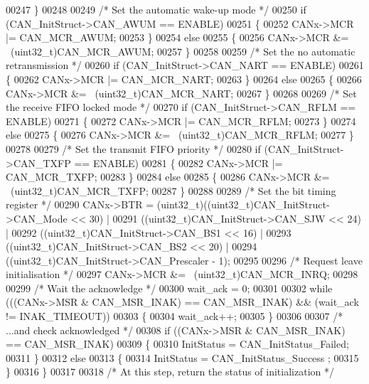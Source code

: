 \begin{DoxyCode}
00247     \}
00248 
00249     \textcolor{comment}{/* Set the automatic wake-up mode */}
00250     \textcolor{keywordflow}{if} (CAN\_InitStruct->CAN\_AWUM == ENABLE)
00251     \{
00252       CANx->MCR |= CAN_MCR_AWUM;
00253     \}
00254     \textcolor{keywordflow}{else}
00255     \{
00256       CANx->MCR &= ~(uint32\_t)CAN_MCR_AWUM;
00257     \}
00258 
00259     \textcolor{comment}{/* Set the no automatic retransmission */}
00260     \textcolor{keywordflow}{if} (CAN\_InitStruct->CAN\_NART == ENABLE)
00261     \{
00262       CANx->MCR |= CAN_MCR_NART;
00263     \}
00264     \textcolor{keywordflow}{else}
00265     \{
00266       CANx->MCR &= ~(uint32\_t)CAN_MCR_NART;
00267     \}
00268 
00269     \textcolor{comment}{/* Set the receive FIFO locked mode */}
00270     \textcolor{keywordflow}{if} (CAN\_InitStruct->CAN\_RFLM == ENABLE)
00271     \{
00272       CANx->MCR |= CAN_MCR_RFLM;
00273     \}
00274     \textcolor{keywordflow}{else}
00275     \{
00276       CANx->MCR &= ~(uint32\_t)CAN_MCR_RFLM;
00277     \}
00278 
00279     \textcolor{comment}{/* Set the transmit FIFO priority */}
00280     \textcolor{keywordflow}{if} (CAN\_InitStruct->CAN\_TXFP == ENABLE)
00281     \{
00282       CANx->MCR |= CAN_MCR_TXFP;
00283     \}
00284     \textcolor{keywordflow}{else}
00285     \{
00286       CANx->MCR &= ~(uint32\_t)CAN_MCR_TXFP;
00287     \}
00288 
00289     \textcolor{comment}{/* Set the bit timing register */}
00290     CANx->BTR = (uint32\_t)((uint32\_t)CAN\_InitStruct->CAN\_Mode << 30) |
00291                 ((uint32\_t)CAN\_InitStruct->CAN\_SJW << 24) |
00292                 ((uint32\_t)CAN\_InitStruct->CAN\_BS1 << 16) |
00293                 ((uint32\_t)CAN\_InitStruct->CAN\_BS2 << 20) |
00294                ((uint32\_t)CAN\_InitStruct->CAN\_Prescaler - 1);
00295 
00296     \textcolor{comment}{/* Request leave initialisation */}
00297     CANx->MCR &= ~(uint32\_t)CAN_MCR_INRQ;
00298 
00299    \textcolor{comment}{/* Wait the acknowledge */}
00300    wait\_ack = 0;
00301 
00302    \textcolor{keywordflow}{while} (((CANx->MSR & CAN_MSR_INAK) == CAN_MSR_INAK) && (wait\_ack != 
      INAK_TIMEOUT))
00303    \{
00304      wait\_ack++;
00305    \}
00306 
00307     \textcolor{comment}{/* ...and check acknowledged */}
00308     \textcolor{keywordflow}{if} ((CANx->MSR & CAN_MSR_INAK) == CAN_MSR_INAK)
00309     \{
00310       InitStatus = CAN_InitStatus_Failed;
00311     \}
00312     \textcolor{keywordflow}{else}
00313     \{
00314       InitStatus = CAN_InitStatus_Success ;
00315     \}
00316   \}
00317 
00318   \textcolor{comment}{/* At this step, return the status of initialization */}

\end{DoxyCode}
